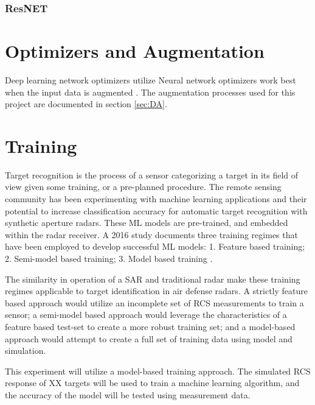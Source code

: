 		\subsubsection{ResNET}



\section{Optimizers and Augmentation}

Deep learning network optimizers utilize Neural network optimizers work best when the input data is augmented \cite{ML_RCS}. The augmentation processes used for this project are documented in section \ref{sec:DA}.

\section{Training}
\label{sec:training}

	Target recognition is the process of a sensor categorizing a target in its field of view given some training, or a pre-planned procedure. The remote sensing community has been experimenting with machine learning applications and their potential to increase classification accuracy for automatic target recognition with synthetic aperture radars. These ML models are pre-trained, and embedded within the radar receiver. A 2016 study documents three training regimes that have been employed to develop successful ML models:  1. Feature based training; 2. Semi-model based training; 3. Model based training \cite{SAR_Survey}.

	The similarity in operation of a SAR and traditional radar make these training regimes applicable to target identification in air defense radars. A strictly feature based approach would utilize an incomplete set of RCS measurements to train a sensor; a semi-model based approach would leverage the characteristics of a feature based test-set to create a more robust training set; and a model-based approach would attempt to create a full set of training data using model and simulation.

	This experiment will utilize a model-based training approach. The simulated RCS response of XX targets will be used to train a machine learning algorithm, and the accuracy of the model will be tested using measurement data.

